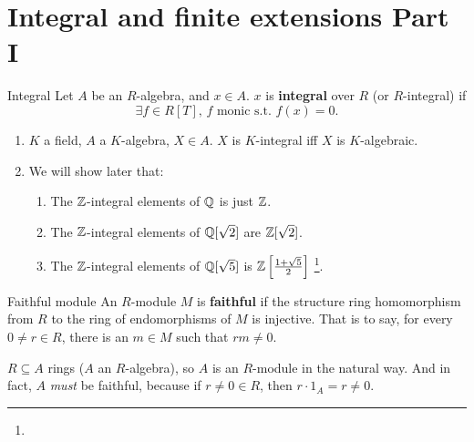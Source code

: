 \documentclass{article}
\begin{document}
\section{Integral and finite extensions Part I}
\begin{fancydefine}{Integral}
    Let $A$ be an $R$-algebra, and $x \in A$. $x$ is \textbf{integral} over $R$ (or $R$-integral) if \[ \exists f \in R[T], \, f \text{ monic s.t. } f(x)=0.\]
\end{fancydefine}
\begin{ex}
    \hspace{0.1cm}
    \begin{enumerate}
        \item $K$ a field, $A$ a $K$-algebra, $X \in A$. $X$ is $K$-integral iff $X$ is $K$-algebraic.
        \item We will show later that: \begin{enumerate}
            \item[1.] The $\mathbb{Z}$-integral elements of $\mathbb{Q}$ is just $\mathbb{Z}$.
            \item[2.] The $\mathbb{Z}$-integral elements of $\mathbb{Q}[\sqrt{2}]$ are $\mathbb{Z}[\sqrt{2}]$.
            \item[3.] The $\mathbb{Z}$-integral elements of $\mathbb{Q}[\sqrt{5}]$ is $\mathbb{Z}\left[\frac{1+\sqrt{5}}{2}\right]$ \footnote{}.
        \end{enumerate}
    \end{enumerate}
\end{ex}
\begin{fancydefine}{Faithful module}
    An $R$-module $M$ is \textbf{faithful} if the structure ring homomorphism from $R$ to the ring of endomorphisms of $M$ is injective. \gap
    That is to say, for every $0 \neq r \in R$, there is an $m \in M$ such that $rm \neq 0$.
\end{fancydefine}
\begin{ex}
    $R \subseteq A$ rings ($A$ an $R$-algebra), so $A$ is an $R$-module in the natural way. And in fact, $A$ \textit{must} be faithful, because if $r \neq 0 \in R$, then $r \cdot 1_{A} = r \neq 0$.
\end{ex}
\end{document}
